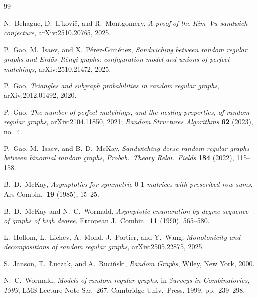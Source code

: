 \documentclass[11pt]{article}
\begin{document}
\begin{thebibliography}{99}

N.~Behague, D.~Il'kovi\v{c}, and R.~Montgomery,
\emph{A proof of the Kim--Vu sandwich conjecture},
arXiv:2510.20765, 2025.

P.~Gao, M.~Isaev, and X.~P\'erez-Gim\'enez,
\emph{Sandwiching between random regular graphs and Erd\H{o}s--R\'enyi graphs:
configuration model and unions of perfect matchings},
arXiv:2510.21472, 2025.

P.~Gao,
\emph{Triangles and subgraph probabilities in random regular graphs},
arXiv:2012.01492, 2020.

P.~Gao,
\emph{The number of perfect matchings, and the nesting properties, of random regular graphs},
arXiv:2104.11850, 2021;
\emph{Random Structures Algorithms} \textbf{62} (2023), no.~4.

P.~Gao, M.~Isaev, and B.~D.~McKay,
\emph{Sandwiching dense random regular graphs between binomial random graphs},
\emph{Probab.\ Theory Relat.\ Fields} \textbf{184} (2022), 115--158.

B.~D.~McKay,
\emph{Asymptotics for symmetric \(0\)-\(1\) matrices with prescribed row sums},
Ars Combin.\ \textbf{19} (1985), 15--25.

B.~D.~McKay and N.~C.~Wormald,
\emph{Asymptotic enumeration by degree sequence of graphs of high degree},
European J.\ Combin.\ \textbf{11} (1990), 565--580.

L.~Hollom, L.~Lichev, A.~Mond, J.~Portier, and Y.~Wang,
\emph{Monotonicity and decompositions of random regular graphs},
arXiv:2505.22875, 2025.

S.~Janson, T.~\L uczak, and A.~Ruci\'nski,
\emph{Random Graphs},
Wiley, New York, 2000.

N.~C.~Wormald,
\emph{Models of random regular graphs},
in \emph{Surveys in Combinatorics, 1999},
LMS Lecture Note Ser.\ 267, Cambridge Univ.\ Press, 1999, pp.~239--298.

\end{thebibliography}
\end{document}
